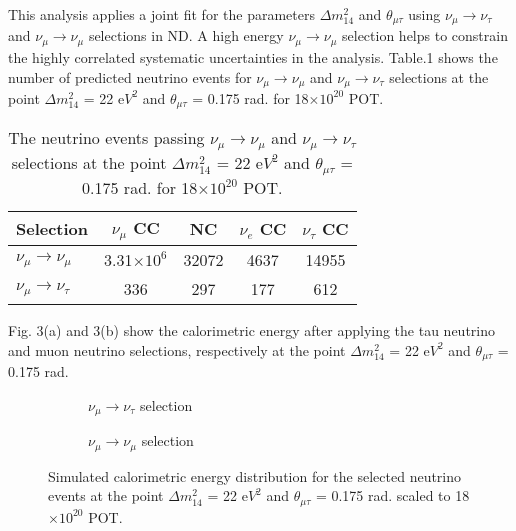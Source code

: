 \documentclass[12pt]{article}
\begin{document}
This analysis applies a joint fit for the parameters  $\Delta m^2_{14}$ and $\theta_{\mu\tau}$ using $\nu_\mu\rightarrow\nu_\tau$  and $\nu_\mu\rightarrow\nu_\mu$  selections in ND. A high energy $\nu_\mu\rightarrow\nu_\mu$ selection helps to constrain the highly correlated systematic uncertainties in the analysis.
Table.1 shows the number of predicted neutrino events for $\nu_\mu\rightarrow\nu_\mu$  and $\nu_\mu\rightarrow\nu_\tau$  selections at the point $\Delta m^2_{14}$ = 22 e$V^2$ and $\theta_{\mu\tau}$ = 0.175 rad. for 18$\times10^{20}$ POT.
\begin{table}[H]
\begin{center}
\begin{tabular}{l|cccc}  
Selection                                                    &  $\nu_\mu$ CC                      & NC            &  $\nu_e$ CC          & $\nu_\tau$ CC\\ \hline
 $\nu_\mu\rightarrow\nu_\mu$                   &   3.31$\times10^6$                                     &     32072      &     4637                 & 14955 \\
$\nu_\mu\rightarrow\nu_\tau$    &  336                                     &     297     & 177 			    & 612 \\ \hline
\end{tabular}
\caption{ The neutrino events passing $\nu_\mu\rightarrow\nu_\mu$  and $\nu_\mu\rightarrow\nu_\tau$  selections at the point $\Delta m^2_{14}$ = 22 e$V^2$ and $\theta_{\mu\tau}$ = 0.175 rad.  for 18$\times10^{20}$ POT.}
\label{tab:blood}
\end{center}
\end{table}

 Fig. 3(a) and 3(b) show 
the calorimetric energy after applying the tau neutrino and muon neutrino selections, respectively at the point $\Delta m^2_{14}$ = 22 e$V^2$ and $\theta_{\mu\tau}$ = 0.175 rad.

\begin{figure}[H]
\centering
\begin{subfigure}{.5\textwidth}
  \centering
   \caption{ $\nu_{\mu} \rightarrow \nu_{\tau}$ selection}
  \label{fig:sub1}
\end{subfigure}%
\begin{subfigure}{.5\textwidth}
  \centering
  \caption{ $\nu_{\mu} \rightarrow \nu_{\mu}$ selection}
  \label{fig:sub2}
\end{subfigure}
\caption{Simulated calorimetric energy distribution for the selected neutrino events at the point $\Delta m^2_{14}$ = 22 e$V^2$ and $\theta_{\mu\tau}$ = 0.175 rad. scaled to 18$\times10^{20}$ POT.}
\label{fig:test}
\end{figure}
%
%
\end{document}
